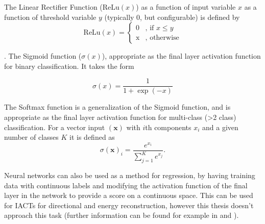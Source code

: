 The Linear Rectifier Function ($\textrm{ReLu}(x)$) as a function of input variable $x$ as a function of threshold variable $y$ (typically 0, but configurable) is defined by
\begin{equation}
    \textrm{ReLu}(x)=\begin{cases}\mbox{0} & \mbox{, if } x \leq y \\ \mbox{x} & \mbox{, otherwise} \end{cases}
\end{equation}

\cite{Keras}. The Sigmoid function ($\sigma(x)$), appropriate as the final layer activation function for binary classification. It takes the form

\begin{equation}
    \sigma(x)=\frac{1}{1+\exp(-x)}
\end{equation}

The Softmax function is a generalization of the Sigmoid function, and is appropriate as the final layer activation function for multi-class (>2 class) classification. For a vector input $(\textbf{x})$ with $i$th components $x_i $ and a given number of classes $K$ it is defined as
\begin{equation}
    \sigma(\textbf{x})_i=\frac{e^{x_i}}{\sum_{j=1}^K e^{x_j}}.
\end{equation}

Neural networks can also be used as a method for regression, by having training data with continuous labels and modifying the activation function of the final layer in the network to provide a score on a continuous space. This can be used for IACTs for directional and energy reconstruction, however this thesis doesn't approach this task (further information can be found for example in \cite{mikaelphd} and \cite{tjarkicrc}).  

